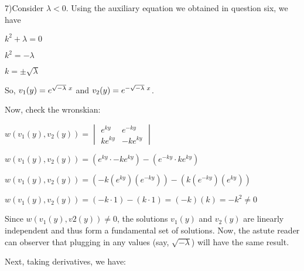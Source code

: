 \documentclass[12pt, executivepaper]{article}
\begin{document}
\vspace{5mm}

\begin{flushleft}

7)Consider $\lambda < 0$. Using the auxiliary equation we obtained in question six, we have \\

\begin{center}

$k^2+ \lambda=0$

$k^2=-\lambda$

$k=\pm \sqrt{\lambda}$

\end{center}

\pagebreak

\vspace*{-40mm}

So, $v_{1}(y)=e^{\sqrt{-\lambda} \hspace{1mm} x}$ and $v_{2}(y)=e^{-\sqrt{-\lambda} \hspace{1mm} x}$.

\hspace{3mm}

Now, check the wronskian:

\begin{center}

$w(v_{1}(y), v_{2}(y))=\begin{vmatrix}
e^{ky} & e^{-ky} \\ 
ke^{ky} & -ke^{ky} 
\end{vmatrix}$

$w(v_{1}(y), v_{2}(y))=(e^{ky} \cdot -ke^{ky})-(e^{-ky} \cdot ke^{ky})$

$w(v_{1}(y), v_{2}(y))=(-k(e^{ky})(e^{-ky}))-(k(e^{-ky})(e^{ky}))$

$w(v_{1}(y), v_{2}(y))=(-k \cdot 1)-(k \cdot 1)=(-k)(k)=-k^2 \neq 0$

\end{center}

Since $w(v_{1}(y), v{2}(y)) \neq 0$, the solutions $v_{1}(y)$ and $v_{2}(y)$ are linearly independent and thus form a fundamental set of solutions. Now, the astute reader can observer that plugging in any values (say, $\sqrt{-\lambda}$) will have the same result.

\vspace{3mm}

Next, taking derivatives, we have: 

\begin{center}


\end{center}
\end{flushleft}
\end{document}
